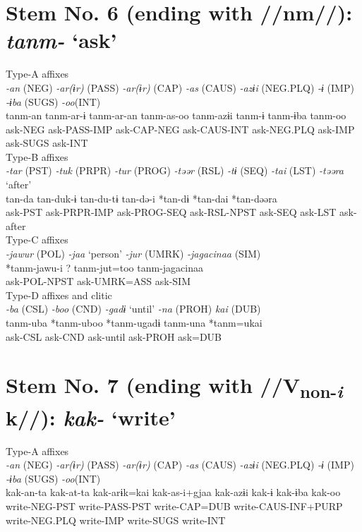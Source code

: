 \section{Stem No. 6 (ending with //nm//): \textit{tanm-} ‘ask’}

\ea Type-A affixes\\
\glll \textit{-an} (NEG)  \textit{-ar(ɨr)} (PASS)  \textit{-ar(ɨr)} (CAP)  \textit{-as} (CAUS)  \textit{-azɨi} (NEG.PLQ)  \textit{-ɨ} (IMP)  \textit{-ɨba} (SUGS)  \textit{-oo}(INT)\\
tanm-an  tanm-ar-ɨ  tanm-ar-an  tanm-as-oo  tanm-azɨi  tanm-ɨ  tanm-ɨba  tanm-oo\\
ask-NEG  ask-PASS-IMP  ask-CAP-NEG  ask-CAUS-INT  ask-NEG.PLQ  ask-IMP  ask-SUGS  ask-INT\\


\ex Type-B affixes\\
\glll \textit{-tar} (PST)  \textit{-tuk} (PRPR)  \textit{-tur} (PROG)  \textit{-təər} (RSL)  \textit{-tɨ} (SEQ)  \textit{-tai} (LST)  \textit{-təəra} ‘after’\\
tan-da  tan-duk-ɨ  tan-du-tɨ  tan-də-i  *tan-dɨ  *tan-dai  *tan-dəəra\\
ask-PST  ask-PRPR-IMP  ask-PROG-SEQ  ask-RSL-NPST  ask-SEQ  ask-LST  ask-after\\


\ex Type-C affixes\\
\glll \textit{-jawur} (POL)  \textit{-jaa} ‘person’  \textit{-jur} (UMRK)  \textit{-jagacinaa} (SIM)\\
*tanm-jawu-i  ?  tanm-jut=too  tanm-jagacinaa\\
ask-POL-NPST    ask-UMRK=ASS  ask-SIM\\


\ex Type-D affixes and clitic\\
\glll \textit{-ba} (CSL)  \textit{-boo} (CND)  \textit{-gadɨ} ‘until’  \textit{-na} (PROH)  \textit{kai} (DUB)\\
tanm-uba  *tanm-uboo  *tanm-ugadɨ  tanm-una  *tanm=ukai\\
ask-CSL  ask-CND  ask-until  ask-PROH  ask=DUB\\
\z

\section{Stem No. 7 (ending with //V\textsubscript{non-}\textit{\textsubscript{i} }k//): \textit{kak-} ‘write’}

\ea Type-A affixes\\
\glll \textit{-an} (NEG)  \textit{-ar(ɨr)} (PASS)  \textit{-ar(ɨr)} (CAP)  \textit{-as} (CAUS)  \textit{-azɨi} (NEG.PLQ)  \textit{-ɨ} (IMP)  \textit{-ɨba} (SUGS)  \textit{-oo}(INT)\\
kak-an-ta  kak-at-ta  kak-arɨk=kai  kak-as-i+gjaa  kak-azɨi  kak-ɨ  kak-ɨba  kak-oo\\
write-NEG-PST  write-PASS-PST  write-CAP=DUB  write-CAUS-INF+PURP  write-NEG.PLQ  write-IMP  write-SUGS  write-INT\\


